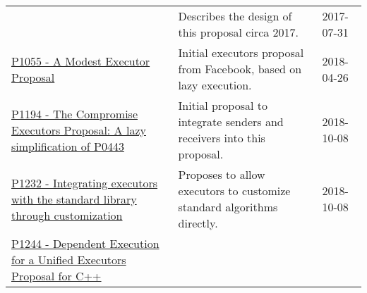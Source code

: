 \documentclass[a4paper,12pt,notitlepage,twoside,openright]{article}
\begin{document}
\begin{longtable}[]{@{}lll@{}}
\begin{minipage}[t]{0.32\columnwidth}
\end{minipage} & \begin{minipage}[t]{0.54\columnwidth}\raggedright
Describes the design of this proposal circa 2017.\strut
\end{minipage} & \begin{minipage}[t]{0.05\columnwidth}\raggedright
2017-07-31\strut
\end{minipage}\tabularnewline
\begin{minipage}[t]{0.32\columnwidth}\raggedright
\href{https://wg21.link/P1055}{P1055 - A Modest Executor Proposal}\strut
\end{minipage} & \begin{minipage}[t]{0.54\columnwidth}\raggedright
Initial executors proposal from Facebook, based on lazy execution.\strut
\end{minipage} & \begin{minipage}[t]{0.05\columnwidth}\raggedright
2018-04-26\strut
\end{minipage}\tabularnewline
\begin{minipage}[t]{0.32\columnwidth}\raggedright
\href{https://wg21.link/P1194}{P1194 - The Compromise Executors
Proposal: A lazy simplification of P0443}\strut
\end{minipage} & \begin{minipage}[t]{0.54\columnwidth}\raggedright
Initial proposal to integrate senders and receivers into this
proposal.\strut
\end{minipage} & \begin{minipage}[t]{0.05\columnwidth}\raggedright
2018-10-08\strut
\end{minipage}\tabularnewline
\begin{minipage}[t]{0.32\columnwidth}\raggedright
\href{https://wg21.link/P1232}{P1232 - Integrating executors with the
standard library through customization}\strut
\end{minipage} & \begin{minipage}[t]{0.54\columnwidth}\raggedright
Proposes to allow executors to customize standard algorithms
directly.\strut
\end{minipage} & \begin{minipage}[t]{0.05\columnwidth}\raggedright
2018-10-08\strut
\end{minipage}\tabularnewline
\begin{minipage}[t]{0.32\columnwidth}\raggedright
\href{https://wg21.link/P1244}{P1244 - Dependent Execution for a Unified
Executors Proposal for C++}\strut
\end{minipage} & \begin{minipage}[t]{0.54\columnwidth}\raggedright

\end{minipage}
\end{longtable}
\end{document}
